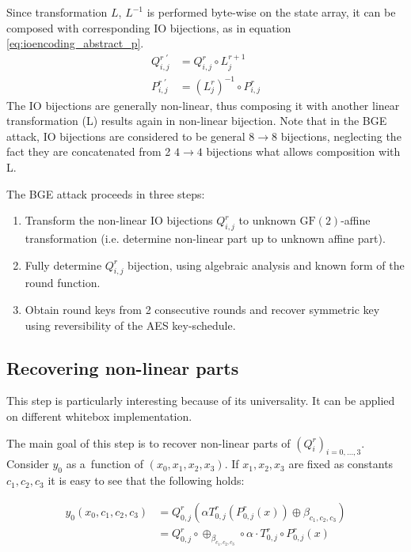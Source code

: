 \documentclass[11pt,oneside,final]{fithesis2}
\newcommand{\gf}{\ensuremath{\text{GF}\left(2\right)}}
\begin{document}
    Since transformation $L$, $L^{-1}$ is performed byte-wise on the state array, it can be composed with corresponding IO bijections, as in equation \ref{eq:ioencoding_abstract_p}.
    \begin{subequations} \label{eq:ioencoding_abstract_q}
    \begin{align}
	Q^{r \; \prime}_{i,j} &= Q^{r}_{i,j} \circ L^{r+1}_{j} \\
	P^{r \; \prime}_{i,j} &= (L^{r}_{j})^{-1} \circ P^{r}_{i,j}
    \end{align}
    \end{subequations}
    The IO bijections are generally non-linear, thus composing it with another linear transformation (L) results again in non-linear bijection. Note that in the BGE
    attack, IO bijections are considered to be general $8\rightarrow8$ bijections, neglecting the fact they are concatenated from 2 $4\rightarrow4$ bijections what allows
    composition with L.
    
    The BGE attack proceeds in three steps:
    \begin{enumerate}
     \item Transform the non-linear IO bijections $Q^{r}_{i,j}$ to unknown $\gf$-affine transformation (i.e. determine non-linear part up to unknown affine part).
     \item Fully determine $Q^{r}_{i,j}$ bijection, using algebraic analysis and known form of the round function.
     \item Obtain round keys from 2 consecutive rounds and recover symmetric key using reversibility of the AES key-schedule.
    \end{enumerate}
    
    \subsection{Recovering non-linear parts}
    This step is particularly interesting because of its universality. It can be applied on different whitebox implementation.
    
    The main goal of this step is to recover non-linear parts of $\left(Q^r_i\right)_{i=0,\dots,3}$. Consider $y_0$ as a~function of $\left(x_0, x_1, x_2, x_3\right)$.
    If $x_1, x_2, x_3$ are fixed as constants $c_1, c_2, c_3$ it is easy to see that the following holds:
    
    \begin{equation} \label{eq:y0}    
    \begin{aligned}
    y_0\left(x_0, c_1, c_2, c_3 \right) &= Q^r_{0,j} \left(\alpha T^r_{0,j}\left(P^r_{0,j}\left(x\right)\right) \oplus \beta_{c_1,c_2,c_3}\right) \\
				        &= Q^r_{0,j} \circ \oplus_{\beta_{c_1,c_2,c_3}} \circ \alpha \cdot T^r_{0,j} \circ P^r_{0,j} \left(x\right)
    \end{aligned}
    \end{equation}
    
\end{document}

